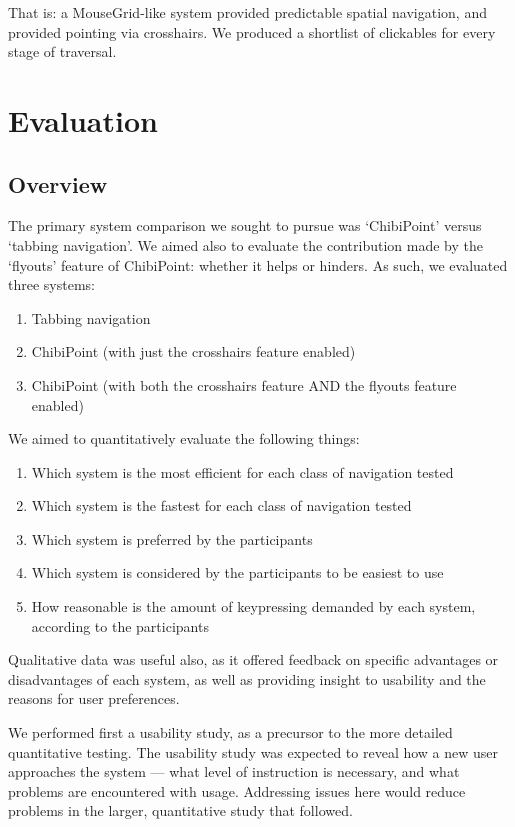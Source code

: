 \documentclass[a4paper, 12pt]{report}
\begin{document}
That is: a MouseGrid-like system provided predictable spatial navigation, and provided pointing via crosshairs. We produced a shortlist of clickables for every stage of traversal.

\chapter{Evaluation}
\label{chap:evaluation}
\section{Overview}
The primary system comparison we sought to pursue was `ChibiPoint' versus `tabbing navigation'. We aimed also to evaluate the contribution made by the `flyouts' feature of ChibiPoint: whether it helps or hinders. As such, we evaluated three systems:
\begin{enumerate}
\item Tabbing navigation
\item ChibiPoint (with just the crosshairs feature enabled)
\item ChibiPoint (with both the crosshairs feature AND the flyouts feature enabled)
\end{enumerate}

We aimed to quantitatively evaluate the following things:
\begin{enumerate}
\item Which system is the most efficient for each class of navigation tested
\item Which system is the fastest for each class of navigation tested
\item Which system is preferred by the participants
\item Which system is considered by the participants to be easiest to use
\item How reasonable is the amount of keypressing demanded by each system, according to the participants
\end{enumerate}

Qualitative data was useful also, as it offered feedback on specific advantages or disadvantages of each system, as well as providing insight to usability and the reasons for user preferences.

We performed first a usability study, as a precursor to the more detailed quantitative testing. The usability study was expected to reveal how a new user approaches the system --- what level of instruction is necessary, and what problems are encountered with usage. Addressing issues here would reduce problems in the larger, quantitative study that followed.
\end{document}
